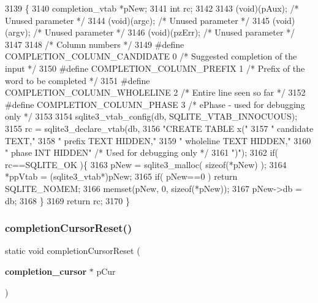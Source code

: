 \begin{DoxyCode}
3139  \{
3140   completion_vtab *pNew;
3141   \textcolor{keywordtype}{int} rc;
3142 
3143   (void)(pAux);    \textcolor{comment}{/* Unused parameter */}
3144   (void)(argc);    \textcolor{comment}{/* Unused parameter */}
3145   (void)(argv);    \textcolor{comment}{/* Unused parameter */}
3146   (void)(pzErr);   \textcolor{comment}{/* Unused parameter */}
3147 
3148 \textcolor{comment}{/* Column numbers */}
3149 \textcolor{preprocessor}{#define COMPLETION\_COLUMN\_CANDIDATE 0  }\textcolor{comment}{/* Suggested completion of the input */}\textcolor{preprocessor}{}
3150 \textcolor{preprocessor}{#define COMPLETION\_COLUMN\_PREFIX    1  }\textcolor{comment}{/* Prefix of the word to be completed */}\textcolor{preprocessor}{}
3151 \textcolor{preprocessor}{#define COMPLETION\_COLUMN\_WHOLELINE 2  }\textcolor{comment}{/* Entire line seen so far */}\textcolor{preprocessor}{}
3152 \textcolor{preprocessor}{#define COMPLETION\_COLUMN\_PHASE     3  }\textcolor{comment}{/* ePhase - used for debugging only */}\textcolor{preprocessor}{}
3153 
3154   sqlite3_vtab_config(db, SQLITE_VTAB_INNOCUOUS);
3155   rc = sqlite3_declare_vtab(db,
3156       \textcolor{stringliteral}{"CREATE TABLE x("}
3157       \textcolor{stringliteral}{"  candidate TEXT,"}
3158       \textcolor{stringliteral}{"  prefix TEXT HIDDEN,"}
3159       \textcolor{stringliteral}{"  wholeline TEXT HIDDEN,"}
3160       \textcolor{stringliteral}{"  phase INT HIDDEN"}        \textcolor{comment}{/* Used for debugging only */}
3161       \textcolor{stringliteral}{")"});
3162   \textcolor{keywordflow}{if}( rc==SQLITE_OK )\{
3163     pNew = sqlite3_malloc( \textcolor{keyword}{sizeof}(*pNew) );
3164     *ppVtab = (sqlite3_vtab*)pNew;
3165     \textcolor{keywordflow}{if}( pNew==0 ) \textcolor{keywordflow}{return} SQLITE_NOMEM;
3166     memset(pNew, 0, \textcolor{keyword}{sizeof}(*pNew));
3167     pNew->db = db;
3168   \}
3169   \textcolor{keywordflow}{return} rc;
3170 \}
\end{DoxyCode}
\mbox{\label{shell_8c_ad263778b9053b200cefb543b4a6d1e2d}} 
\subsubsection{completion\+Cursor\+Reset()}
{\footnotesize\ttfamily static void completion\+Cursor\+Reset (\begin{DoxyParamCaption}\item[{\textbf{ completion\+\_\+cursor} $\ast$}]{p\+Cur }\end{DoxyParamCaption})\hspace{0.3cm}{\ttfamily [static]}}



